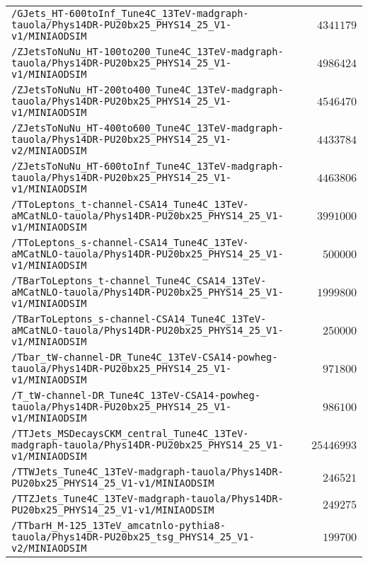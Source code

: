 \begin{center}
\begin{tabular}{lr}
\verb!/GJets_HT-600toInf_Tune4C_13TeV-madgraph-tauola/Phys14DR-PU20bx25_PHYS14_25_V1-v1/MINIAODSIM! &$ 4341179$\tabularnewline
\verb!/ZJetsToNuNu_HT-100to200_Tune4C_13TeV-madgraph-tauola/Phys14DR-PU20bx25_PHYS14_25_V1-v1/MINIAODSIM! &$ 4986424$\tabularnewline
\verb!/ZJetsToNuNu_HT-200to400_Tune4C_13TeV-madgraph-tauola/Phys14DR-PU20bx25_PHYS14_25_V1-v1/MINIAODSIM! &$ 4546470$\tabularnewline
\verb!/ZJetsToNuNu_HT-400to600_Tune4C_13TeV-madgraph-tauola/Phys14DR-PU20bx25_PHYS14_25_V1-v2/MINIAODSIM! &$ 4433784$\tabularnewline
\verb!/ZJetsToNuNu_HT-600toInf_Tune4C_13TeV-madgraph-tauola/Phys14DR-PU20bx25_PHYS14_25_V1-v1/MINIAODSIM! &$ 4463806$\tabularnewline
\verb!/TToLeptons_t-channel-CSA14_Tune4C_13TeV-aMCatNLO-tauola/Phys14DR-PU20bx25_PHYS14_25_V1-v1/MINIAODSIM! &$ 3991000$\tabularnewline
\verb!/TToLeptons_s-channel-CSA14_Tune4C_13TeV-aMCatNLO-tauola/Phys14DR-PU20bx25_PHYS14_25_V1-v1/MINIAODSIM! &$  500000$\tabularnewline
\verb!/TBarToLeptons_t-channel_Tune4C_CSA14_13TeV-aMCatNLO-tauola/Phys14DR-PU20bx25_PHYS14_25_V1-v1/MINIAODSIM! &$ 1999800$\tabularnewline
\verb!/TBarToLeptons_s-channel-CSA14_Tune4C_13TeV-aMCatNLO-tauola/Phys14DR-PU20bx25_PHYS14_25_V1-v1/MINIAODSIM! &$  250000$\tabularnewline
\verb!/Tbar_tW-channel-DR_Tune4C_13TeV-CSA14-powheg-tauola/Phys14DR-PU20bx25_PHYS14_25_V1-v1/MINIAODSIM! &$  971800$\tabularnewline
\verb!/T_tW-channel-DR_Tune4C_13TeV-CSA14-powheg-tauola/Phys14DR-PU20bx25_PHYS14_25_V1-v1/MINIAODSIM! &$  986100$\tabularnewline
\verb!/TTJets_MSDecaysCKM_central_Tune4C_13TeV-madgraph-tauola/Phys14DR-PU20bx25_PHYS14_25_V1-v1/MINIAODSIM! &$25446993$\tabularnewline
\verb!/TTWJets_Tune4C_13TeV-madgraph-tauola/Phys14DR-PU20bx25_PHYS14_25_V1-v1/MINIAODSIM! &$  246521$\tabularnewline
\verb!/TTZJets_Tune4C_13TeV-madgraph-tauola/Phys14DR-PU20bx25_PHYS14_25_V1-v1/MINIAODSIM! &$  249275$\tabularnewline
\verb!/TTbarH_M-125_13TeV_amcatnlo-pythia8-tauola/Phys14DR-PU20bx25_tsg_PHYS14_25_V1-v2/MINIAODSIM! &$  199700$\tabularnewline
\bottomrule
\end{tabular}\end{center}
